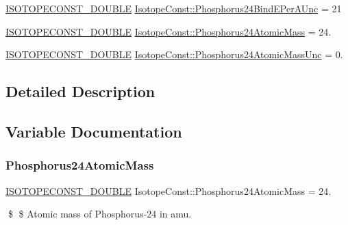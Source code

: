 \begin{DoxyCompactItemize}
\mbox{\hyperlink{group___isotope_const-_macros_ga8f45a7272ce02c0b4c65c44636ed719a}{I\+S\+O\+T\+O\+P\+E\+C\+O\+N\+S\+T\+\_\+\+D\+O\+U\+B\+LE}} \mbox{\hyperlink{group___isotope_const-_phosphorus-_p24_gafcc1bdaa3812c754e61f00c7797df439}{Isotope\+Const\+::\+Phosphorus24\+Bind\+E\+Per\+A\+Unc}} = 21
\item 
\mbox{\hyperlink{group___isotope_const-_macros_ga8f45a7272ce02c0b4c65c44636ed719a}{I\+S\+O\+T\+O\+P\+E\+C\+O\+N\+S\+T\+\_\+\+D\+O\+U\+B\+LE}} \mbox{\hyperlink{group___isotope_const-_phosphorus-_p24_ga32d80fe18c8a4d9fc5eff543d5213b6b}{Isotope\+Const\+::\+Phosphorus24\+Atomic\+Mass}} = 24.
\item 
\mbox{\hyperlink{group___isotope_const-_macros_ga8f45a7272ce02c0b4c65c44636ed719a}{I\+S\+O\+T\+O\+P\+E\+C\+O\+N\+S\+T\+\_\+\+D\+O\+U\+B\+LE}} \mbox{\hyperlink{group___isotope_const-_phosphorus-_p24_gab27d4e3a67f17b0e8f149b3e477a7a3c}{Isotope\+Const\+::\+Phosphorus24\+Atomic\+Mass\+Unc}} = 0.
\end{DoxyCompactItemize}


\subsection{Detailed Description}


\subsection{Variable Documentation}
\mbox{\label{group___isotope_const-_phosphorus-_p24_ga32d80fe18c8a4d9fc5eff543d5213b6b}} 
\subsubsection{\texorpdfstring{Phosphorus24\+Atomic\+Mass}{Phosphorus24AtomicMass}}
{\footnotesize\ttfamily \mbox{\hyperlink{group___isotope_const-_macros_ga8f45a7272ce02c0b4c65c44636ed719a}{I\+S\+O\+T\+O\+P\+E\+C\+O\+N\+S\+T\+\_\+\+D\+O\+U\+B\+LE}} Isotope\+Const\+::\+Phosphorus24\+Atomic\+Mass = 24.}

\$ \$ Atomic mass of Phosphorus-\/24 in amu. \mbox{\label{group___isotope_const-_phosphorus-_p24_gab27d4e3a67f17b0e8f149b3e477a7a3c}} 
